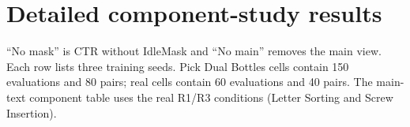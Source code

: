 \clearpage
\section{Detailed component-study results}
\label{app:e4}
``No mask'' is CTR without IdleMask and ``No main'' removes the main view. Each row lists three training seeds. Pick Dual Bottles cells contain 150 evaluations and 80 pairs; real cells contain 60 evaluations and 40 pairs. The main-text component table uses the real R1/R3 conditions (Letter Sorting and Screw Insertion).
{\setlength{\tabcolsep}{3pt}}